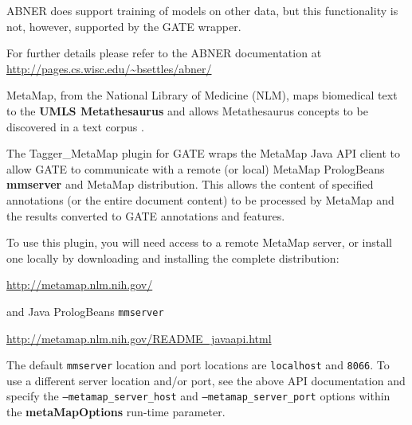 ABNER does support training of models on other data, but this functionality is
not, however, supported by the GATE wrapper.

For further details please refer to the ABNER documentation at
\url{http://pages.cs.wisc.edu/~bsettles/abner/}


MetaMap, from the National Library of Medicine (NLM), maps biomedical text to 
the \textbf{UMLS Metathesaurus} and allows Metathesaurus concepts to be 
discovered in a text corpus \cite{Aronson10}.

The Tagger\_MetaMap plugin for GATE wraps the MetaMap Java API client to allow GATE to communicate with a remote (or local) MetaMap PrologBeans \textbf{mmserver} and MetaMap distribution. This allows the content of specified annotations (or the entire document content) to be processed by MetaMap and the results converted to GATE annotations and features.

To use this plugin, you will need access to a remote MetaMap server, or install one locally by downloading and installing the complete distribution:

\url{http://metamap.nlm.nih.gov/}

and Java PrologBeans \texttt{mmserver}

\url{http://metamap.nlm.nih.gov/README_javaapi.html}

The default \texttt{mmserver} location and port locations are \texttt{localhost} and \texttt{8066}. To use a different server location and/or port, see the above API documentation and specify the \texttt{--metamap\_server\_host} and \texttt{--metamap\_server\_port} options within the \textbf{metaMapOptions} run-time parameter.


